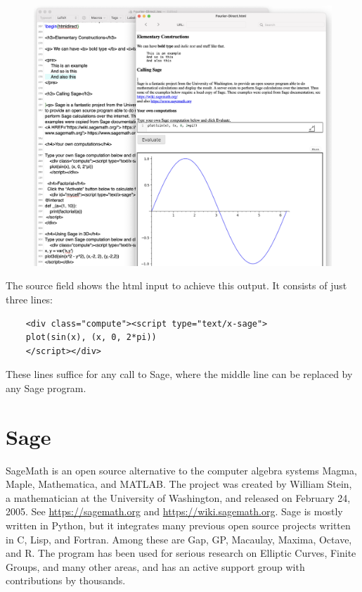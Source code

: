 \documentclass[11pt, oneside]{article}   	%
\begin{document}
\begin{figure}[htbp] %
     \includegraphics[width=6.5in.]{Graphics/shot5.png} %
   \label{fig:example}
\end{figure}

The source field shows the html input to achieve this output. It consists of just three lines:
\begin{verbatim}
    <div class="compute"><script type="text/x-sage">
    plot(sin(x), (x, 0, 2*pi))
    </script></div>
\end{verbatim}

These lines suffice for any call to Sage, where the middle line can be replaced by any Sage
program. 

\section{Sage}

SageMath is an open source alternative to the computer algebra systems Magma, Maple, Mathematica, and MATLAB. The project was created by William Stein, a mathematician at the University of Washington, and released on February 24, 2005. See \url{https://sagemath.org} and \url{https://wiki.sagemath.org}. 
Sage is mostly written in Python, but it integrates many previous open source projects written in C, Lisp, and Fortran. Among these are Gap, GP, Macaulay, Maxima, Octave, and R. The program has been used for serious research on Elliptic Curves, Finite Groups, and many other areas, and has an active support group with contributions by thousands.
\end{document}
